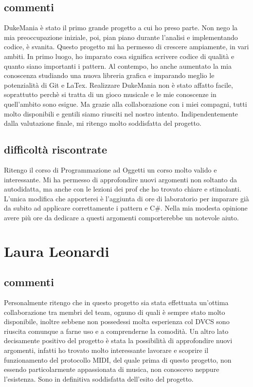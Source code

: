 \documentclass[a4paper,12pt]{report}
\begin{document}
\subsection{commenti}
DukeMania è stato il primo grande progetto a cui ho preso parte. 
Non nego la mia preoccupazione iniziale, poi, pian piano durante l'analisi e implementando codice, è svanita.
Questo progetto mi ha permesso di crescere ampiamente, in vari ambiti.
In primo luogo, ho imparato cosa significa scrivere codice di qualità e quanto siano importanti i pattern.
Al contempo, ho anche aumentato la mia conoscenza studiando una nuova libreria grafica e imparando meglio le potenzialità di Git e LaTex. 
Realizzare DukeMania non è stato affatto facile, soprattutto perchè si tratta di un gioco musicale e le mie conoscenze in quell'ambito
sono esigue. Ma grazie alla collaborazione con i miei compagni, tutti molto disponibili e gentili siamo riusciti nel nostro intento.
Indipendentemente dalla valutazione finale, mi ritengo molto soddisfatta del progetto.
\subsection{difficoltà riscontrate}
Ritengo il corso di Programmazione ad Oggetti un corso molto valido e interessante. 
Mi ha permesso di approfondire nuovi argomenti non soltanto da autodidatta, ma anche con le lezioni dei prof 
che ho trovato chiare e stimolanti. L'unica modifica che apporterei è l'aggiunta di ore di laboratorio per
imparare già da subito ad applicare correttamente i pattern e C\#. Nella mia modesta opinione avere più ore da dedicare a questi argomenti
comporterebbe un notevole aiuto.
\newpage
\section{Laura Leonardi}
\subsection{commenti}
Personalmente ritengo che in questo progetto sia stata effettuata un'ottima collaborazione tra membri del team, ognuno di quali è sempre stato molto disponibile, inoltre sebbene non possedessi molta esperienza col DVCS sono riuscita comunque a farne uso e a comprenderne la comodità. Un altro lato decisamente positivo del progetto è stata la possibilità di approfondire nuovi argomenti, infatti ho trovato molto interessante lavorare e scoprire il funzionamento del protocollo MIDI, del quale prima di questo progetto, non essendo particolarmente appassionata di musica, non conoscevo neppure l'esistenza. Sono in definitiva soddisfatta dell'esito del progetto.
\end{document}

